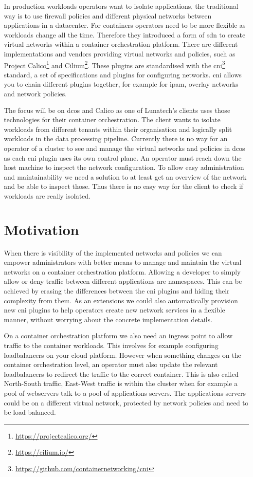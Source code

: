 In production workloads operators want to isolate applications, the traditional way is to use firewall policies and different physical networks between applications in a datacenter. For containers operators need to be more flexible as workloads change all the time. Therefore they introduced a form of \gls{sdn} to create virtual networks within a container orchestration platform.  There are different implementations and vendors providing virtual networks and policies, such as Project Calico\footnote{\url{https://projectcalico.org/}}\cite{calico} and Cilium\footnote{\url{https://cilium.io/}}. These plugins are standardised with the \gls{cni}\footnote{\url{https://github.com/containernetworking/cni}} standard, a set of specifications and plugins for configuring networks. \Gls{cni} allows you to chain different plugins together, for example for \gls{ipam}, overlay networks and network policies.

The focus will be on \gls{dcos} and Calico as one of Lunatech's clients uses those technologies for their container orchestration. The client wants to isolate workloads from different tenants within their organisation and logically split workloads in the data processing pipeline. Currently there is no way for an operator of a cluster to see and manage the virtual networks and policies in \gls{dcos} as each \gls{cni} plugin uses its own control plane. An operator must reach down the host machine to inspect the network configuration. To allow easy administration and maintainability we need a solution to at least get an overview of the network and be able to inspect those. Thus there is no easy way for the client to check if workloads are really isolated. 
\section{Motivation}
When there is visibility of the implemented networks and policies we can empower administrators with better means to manage and maintain the virtual networks on a container orchestration platform. Allowing a developer to simply allow or deny traffic between different applications are namespaces. This can be achieved by erasing the differences between the \gls{cni} plugins and hiding their complexity from them. As an extensions we could also automatically provision new \gls{cni} plugins to help operators create new network services in a flexible manner, without worrying about the concrete implementation details.

On a container orchestration platform we also need an ingress point to allow traffic to the container workloads. This involves for example configuring loadbalancers on your cloud platform. However when something changes on the container orchestration level, an operator must also update the relevant loadbalancers to redirect the traffic to the correct container. This is also called North-South traffic, East-West traffic is within the cluster when for example a pool of webservers talk to a pool of applications servers. The applications servers could be on a different virtual network, protected by network policies and need to be load-balanced.

